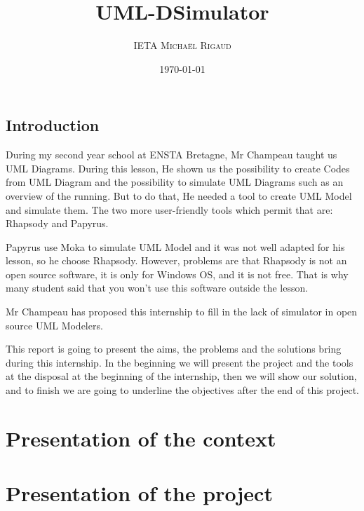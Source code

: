 \documentclass[a4paper, 11pt, oneside, oldfontcommands]{memoir}
\title{UML-DSimulator}
\author{\textsc{IETA Michaël Rigaud }}
\date{\today}
\newcounter{th}[chapter]
\begin{document}
\maketitle
\thispagestyle{empty}
\newpage




\tableofcontents



\chapter*{Introduction}

During my second year school at ENSTA Bretagne, Mr Champeau taught us UML Diagrams. During this lesson, He shown us the possibility to create Codes from UML Diagram and the possibility to simulate UML Diagrams such as an overview of the running. But to do that, He needed a tool to create UML Model and simulate them. The two more user-friendly tools which permit that are: Rhapsody and Papyrus.

Papyrus use Moka to simulate UML Model and it was not well adapted for his lesson, so he choose Rhapsody. However, problems are that Rhapsody is not an open source software, it is only for Windows OS, and it is not free. That is why many student said that you won't use this software outside the lesson.

Mr Champeau has proposed this internship to fill in the lack of simulator in open source UML Modelers.

This report is going to present the aims, the problems and the solutions bring during this internship. In the beginning we will present the project and the tools at the disposal at the beginning of the internship, then we will show our solution, and to finish we are going to underline the objectives after the end of this project.

\newpage

\part{Presentation of the context}




\part{Presentation of the project}
\end{document}
